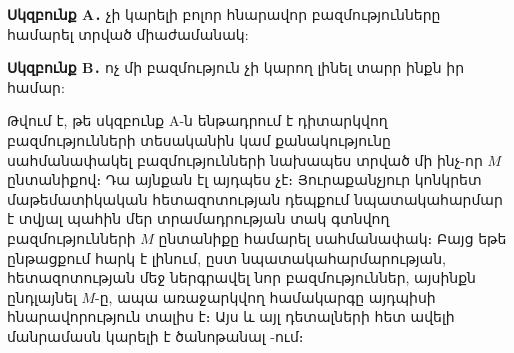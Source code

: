 \documentclass[./main.tex]{subfiles}
\begin{document}
\par\textbf{Սկզբունք A․} չի կարելի բոլոր հնարավոր բազմությունները համարել տրված միաժամանակ:
\par\textbf{Սկզբունք B․} ոչ մի բազմություն չի կարող լինել տարր ինքն իր համար:
\par Թվում է, թե սկզբունք A-ն ենթադրում է դիտարկվող բազմությունների տեսա\-կա\-նին կամ քանակությունը սահմանափակել բազմությունների նախապես տրված մի ինչ-որ $M$ ընտանիքով։ Դա այնքան էլ այդպես չէ։ Յուրաքանչյուր կոնկրետ մաթե\-մա\-տիկա\-կան հետազոտության դեպքում նպատակահարմար է տվյալ պահին մեր տրա\-մա\-դրության տակ գտնվող բազմությունների $M$ ընտանիքը համարել սահ\-մա\-նա\-փակ։ Բայց եթե ընթացքում հարկ է լինում, ըստ նպատակահարմարության, հետա\-զո\-տու\-թյան մեջ ներգրավել նոր բազմություններ, այսինքն ընդլայնել $M$-ը, ապա առա\-ջարկ\-վող համակարգը այդպիսի հնարավորություն տալիս է։ Այս և այլ դետալների հետ ավելի մանրամասն կարելի է ծանոթանալ \cite{Arxangelski}-ում։



\end{document}
